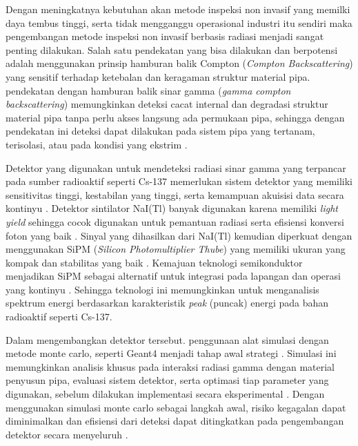 \documentclass[12pt,a4paper]{report}
\begin{document}
Dengan meningkatnya kebutuhan akan metode inspeksi non invasif yang memilki daya tembus tinggi, serta tidak mengganggu operasional industri itu sendiri maka pengembangan metode inspeksi non invasif berbasis radiasi menjadi sangat penting dilakukan. Salah satu pendekatan yang bisa dilakukan dan berpotensi
adalah menggunakan prinsip hamburan balik Compton (\textit{Compton Backscattering}) yang sensitif terhadap ketebalan dan keragaman struktur material pipa. pendekatan dengan hamburan balik sinar gamma (\textit{gamma compton backscattering}) memungkinkan deteksi cacat internal dan degradasi struktur material pipa tanpa perlu
akses langsung ada permukaan pipa, sehingga dengan pendekatan ini deteksi dapat dilakukan pada sistem pipa yang tertanam, terisolasi, atau pada kondisi yang ekstrim \cite{Ma2025}\cite{ref17}\cite{May2022}.

Detektor yang digunakan untuk mendeteksi radiasi sinar gamma yang terpancar pada sumber radioaktif seperti Cs-137 memerlukan sistem detektor yang memiliki sensitivitas tinggi, kestabilan yang tinggi, serta kemampuan akuisisi data secara kontinyu \cite{Yu2024}\cite{Prihtiadi2021}. Detektor sintilator NaI(Tl) banyak digunakan karena
memiliki \textit{light yield} sehingga cocok digunakan untuk pemantuan radiasi serta efisiensi konversi foton yang baik \cite{Adhikari2021}\cite{Hahn2025}. Sinyal yang dihasilkan dari NaI(Tl) kemudian diperkuat dengan menggunakan SiPM (\textit{Silicon Photomultiplier Thube}) yang memiliki ukuran yang kompak dan stabilitas yang baik \cite{Lee2024}\cite{Carlin2025}. 
Kemajuan teknologi semikonduktor menjadikan SiPM sebagai alternatif untuk integrasi pada lapangan dan operasi yang kontinyu \cite{Prihtiadi2018}\cite{Yu2024_arxiv}. Sehingga teknologi ini memungkinkan untuk menganalisis spektrum energi berdasarkan karakteristik \textit{peak} (puncak) energi pada bahan radioaktif seperti Cs-137.

Dalam mengembangkan detektor tersebut. penggunaan alat simulasi dengan metode monte carlo, seperti Geant4 menjadi tahap awal strategi \cite{Parishan2026}. Simulasi ini memungkinkan analisis khusus pada interaksi radiasi gamma dengan material penyusun pipa, evaluasi sistem detektor, serta optimasi tiap parameter yang digunakan, sebelum 
dilakukan implementasi secara eksperimental \cite{ref29}. Dengan menggunakan simulasi monte carlo sebagai langkah awal, risiko kegagalan dapat diminimalkan dan efisiensi dari deteksi dapat ditingkatkan pada pengembangan detektor secara menyeluruh \cite{ref30}.
\end{document}
